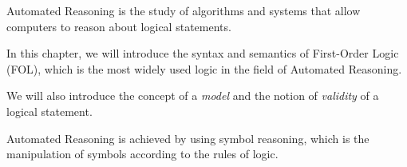 Automated Reasoning is the study of algorithms and systems that allow computers to reason about 
logical statements. 

In this chapter, we will introduce the syntax and semantics of First-Order Logic (FOL), 
which is the most widely used logic in the field of Automated Reasoning. 

We will also introduce the concept of a \textit{model} and 
the notion of \textit{validity} of a logical statement.

Automated Reasoning is achieved by using symbol reasoning, which is the manipulation of symbols
according to the rules of logic.